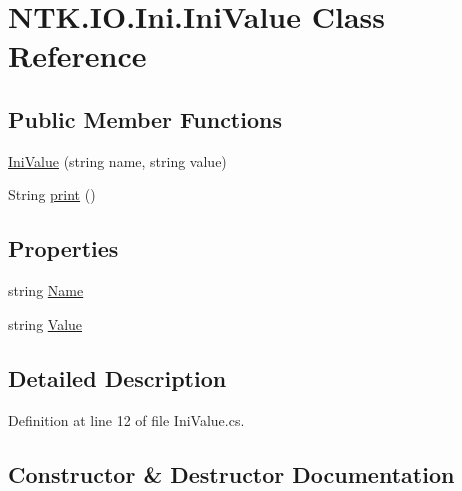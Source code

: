 \hypertarget{class_n_t_k_1_1_i_o_1_1_ini_1_1_ini_value}{}\section{N\+T\+K.\+I\+O.\+Ini.\+Ini\+Value Class Reference}
\label{class_n_t_k_1_1_i_o_1_1_ini_1_1_ini_value}


 


\subsection*{Public Member Functions}
\begin{DoxyCompactItemize}
\item 
\mbox{\hyperlink{class_n_t_k_1_1_i_o_1_1_ini_1_1_ini_value_ae5cb523ea9e983648e1a9f26d3de4670}{Ini\+Value}} (string name, string value)
\item 
String \mbox{\hyperlink{class_n_t_k_1_1_i_o_1_1_ini_1_1_ini_value_ac063ebe81a3e39fe6f3412ce2b533db7}{print}} ()
\end{DoxyCompactItemize}
\subsection*{Properties}
\begin{DoxyCompactItemize}
\item 
string \mbox{\hyperlink{class_n_t_k_1_1_i_o_1_1_ini_1_1_ini_value_a20b705f1034c32d2ddf936040ec4845f}{Name}}
\item 
string \mbox{\hyperlink{class_n_t_k_1_1_i_o_1_1_ini_1_1_ini_value_a2b4e53d42dae3fbc493353fa2a4d75f4}{Value}}
\end{DoxyCompactItemize}


\subsection{Detailed Description}




Definition at line 12 of file Ini\+Value.\+cs.



\subsection{Constructor \& Destructor Documentation}
\mbox{\label{class_n_t_k_1_1_i_o_1_1_ini_1_1_ini_value_ae5cb523ea9e983648e1a9f26d3de4670}} 

